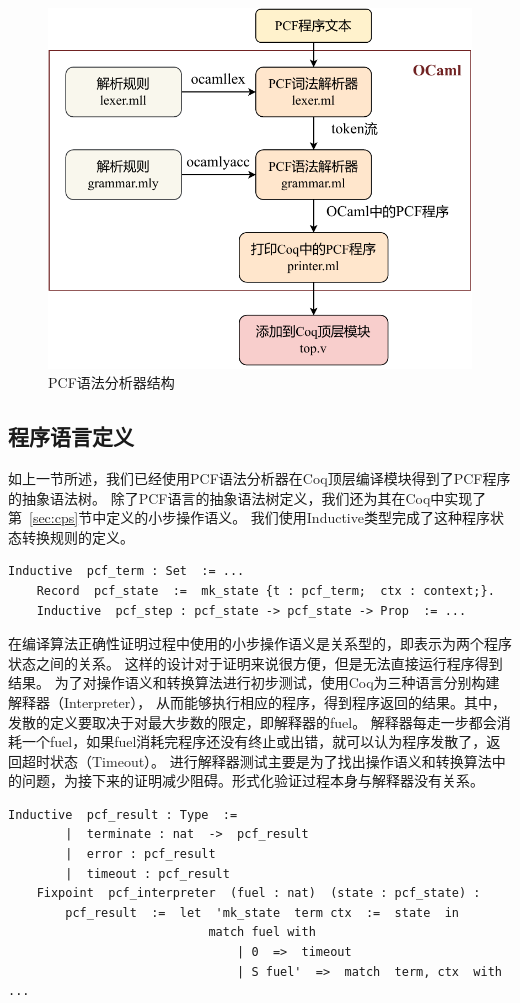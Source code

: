 \begin{figure}[htbp]
    \centering
    \includegraphics[width=0.7\linewidth]{figures/pcfparser.pdf}
    \caption{PCF语法分析器结构}\label{fig:parser}
\end{figure}

\subsection{程序语言定义}

如上一节所述，我们已经使用PCF语法分析器在Coq顶层编译模块得到了PCF程序的抽象语法树。
除了PCF语言的抽象语法树定义，我们还为其在Coq中实现了第~\ref{sec:cps}节中定义的小步操作语义。
我们使用Inductive类型完成了这种程序状态转换规则的定义。

\begin{lstlisting}[language=Coq]
    Inductive  pcf_term : Set  := ...
    Record  pcf_state  :=  mk_state {t : pcf_term;  ctx : context;}.
    Inductive  pcf_step : pcf_state -> pcf_state -> Prop  := ...
\end{lstlisting}

在编译算法正确性证明过程中使用的小步操作语义是关系型的，即表示为两个程序状态之间的关系。
这样的设计对于证明来说很方便，但是无法直接运行程序得到结果。
为了对操作语义和转换算法进行初步测试，使用Coq为三种语言分别构建解释器（Interpreter），
从而能够执行相应的程序，得到程序返回的结果。其中，发散的定义要取决于对最大步数的限定，即解释器的fuel。
解释器每走一步都会消耗一个fuel，如果fuel消耗完程序还没有终止或出错，就可以认为程序发散了，返回超时状态（Timeout）。
进行解释器测试主要是为了找出操作语义和转换算法中的问题，为接下来的证明减少阻碍。形式化验证过程本身与解释器没有关系。

\begin{lstlisting}[language=Coq]
    Inductive  pcf_result : Type  := 
        |  terminate : nat  ->  pcf_result 
        |  error : pcf_result
        |  timeout : pcf_result
    Fixpoint  pcf_interpreter  (fuel : nat)  (state : pcf_state) : 
        pcf_result  :=  let  'mk_state  term ctx  :=  state  in
                            match fuel with 
                                | 0  =>  timeout 
                                | S fuel'  =>  match  term, ctx  with ...
\end{lstlisting}

